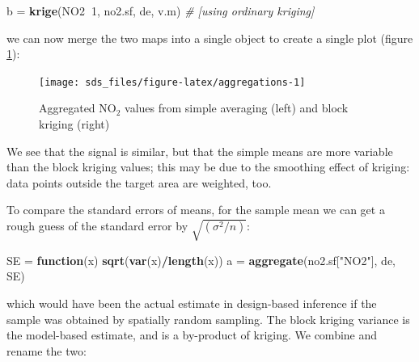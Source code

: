 \documentclass[]{book}
\newenvironment{Shaded}{\begin{snugshade}}{\end{snugshade}}
\newcommand{\CommentTok}[1]{\textcolor[rgb]{0.56,0.35,0.01}{\textit{#1}}}
\newcommand{\ControlFlowTok}[1]{\textcolor[rgb]{0.13,0.29,0.53}{\textbf{#1}}}
\newcommand{\DecValTok}[1]{\textcolor[rgb]{0.00,0.00,0.81}{#1}}
\newcommand{\KeywordTok}[1]{\textcolor[rgb]{0.13,0.29,0.53}{\textbf{#1}}}
\newcommand{\NormalTok}[1]{#1}
\newcommand{\OperatorTok}[1]{\textcolor[rgb]{0.81,0.36,0.00}{\textbf{#1}}}
\newcommand{\StringTok}[1]{\textcolor[rgb]{0.31,0.60,0.02}{#1}}
\begin{document}
\begin{Shaded}
\begin{Highlighting}[]
\NormalTok{b =}\StringTok{ }\KeywordTok{krige}\NormalTok{(NO2}\OperatorTok{~}\DecValTok{1}\NormalTok{, no2.sf, de, v.m)}
\CommentTok{# [using ordinary kriging]}
\end{Highlighting}
\end{Shaded}

we can now merge the two maps into a single object to create a single plot (figure \ref{fig:aggregations}):

\begin{Shaded}
\end{Shaded}



\begin{figure}

{\centering \texttt{[image: sds\_files/figure-latex/aggregations-1]} 

}

\caption{Aggregated NO\(_2\) values from simple averaging (left) and block kriging (right)}\label{fig:aggregations}
\end{figure}

We see that the signal is similar, but that the simple means are
more variable than the block kriging values; this may be due to
the smoothing effect of kriging: data points outside the target
area are weighted, too.

To compare the standard errors of means, for the sample mean we
can get a rough guess of the standard error by \(\sqrt{(\sigma^2/n)}\):

\begin{Shaded}
\begin{Highlighting}[]
\NormalTok{SE =}\StringTok{ }\ControlFlowTok{function}\NormalTok{(x) }\KeywordTok{sqrt}\NormalTok{(}\KeywordTok{var}\NormalTok{(x)}\OperatorTok{/}\KeywordTok{length}\NormalTok{(x))}
\NormalTok{a =}\StringTok{ }\KeywordTok{aggregate}\NormalTok{(no2.sf[}\StringTok{"NO2"}\NormalTok{], de, SE)}
\end{Highlighting}
\end{Shaded}

which would have been the actual estimate in design-based inference
if the sample was obtained by spatially random sampling.
The block kriging variance is the model-based estimate, and is
a by-product of kriging. We combine and rename the two:
\end{document}
